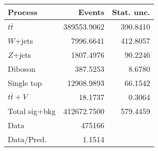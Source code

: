 \begin{tabular}{l|r|r}
\hline
\hline
Process & Events & Stat. unc. \\ 
\hline
$t\bar{t}$ & 389553.9062 & 390.8410\\
$W$+jets & 7996.6641 & 412.8057\\
$Z$+jets & 1807.4976 & 90.2246\\
Diboson & 387.5253 & 8.6780\\
Single top & 12908.9893 & 66.1542\\
$t\bar{t}+V$ & 18.1737 & 0.3064\\
\hline
Total sig+bkg & 412672.7500 & 579.4459\\
\hline
Data & 475166 & \\
\hline
Data/Pred. &1.1514& \\
\hline
\end{tabular}
